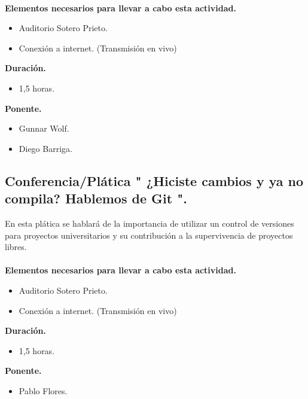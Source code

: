 \documentclass[a4paper,11pt]{article}                 %
\begin{document}
      \paragraph{}
  \textbf{Elementos necesarios para llevar a cabo esta actividad.}
  \begin{itemize}
    \label{list:ddigitales}
    \item Auditorio Sotero Prieto.
    \item Conexión a internet. (Transmisión en vivo)
  \end{itemize}
  
  \textbf{Duración.}
  \begin{itemize}
    \item 1,5 horas.
  \end{itemize}
  
    \textbf{Ponente.}
  \begin{itemize}
    \item Gunnar Wolf.
    \item Diego Barriga.
  \end{itemize}
  

  
  \subsection{Conferencia/Plática " ¿Hiciste cambios y ya no compila? Hablemos de Git ".}                                     %
   En esta plática se hablará de la importancia de utilizar un control de versiones para proyectos universitarios y su contribución a la supervivencia de proyectos libres.
      \paragraph{}
  \textbf{Elementos necesarios para llevar a cabo esta actividad.}
  \begin{itemize}
    \label{list:github}
    \item Auditorio Sotero Prieto.
        \item Conexión a internet. (Transmisión en vivo)
  \end{itemize}
  
  \textbf{Duración.}
  \begin{itemize}
    \item 1,5 horas.
  \end{itemize}
  
        \textbf{Ponente.}
  \begin{itemize}
    \item Pablo Flores.
  \end{itemize}
  
\end{document}
